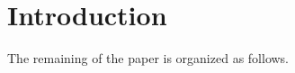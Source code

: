 \section{Introduction}\label{intro}












The remaining of the paper is organized as follows. 
